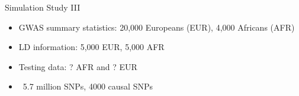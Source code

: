 \documentclass{beamer}
\begin{document}
\begin{frame}{Simulation Study III}
\begin{itemize}
\tiny
    \item GWAS summary statistics: 20,000 Europeans (EUR), 4,000 Africans (AFR)
    \item LD information: 5,000 EUR, 5,000 AFR 
    \item Testing data: ? AFR and ? EUR
    \item ~5.7 million SNPs, 4000 causal SNPs
\end{itemize}

\begin{figure}[h]	
\noindent{}
   \label{fig:methods comparison}
\end{figure}

\end{frame}
\end{document}
